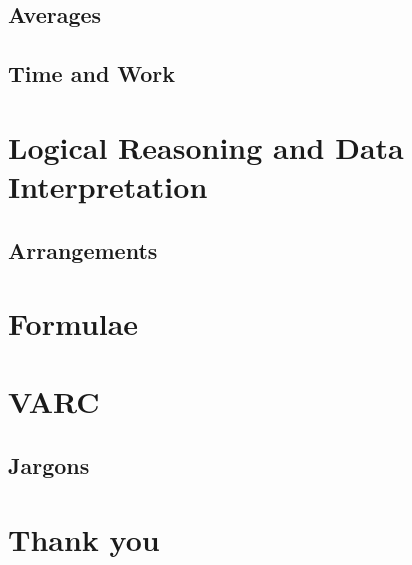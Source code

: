 \documentclass{book}
\begin{document}
\chapter{Averages}


\chapter{Time and Work}




\part{Logical Reasoning and Data Interpretation}

\chapter{Arrangements}





\part{Formulae}


\part{VARC}

\chapter{Jargons}


\part{Thank you}
\end{document}
